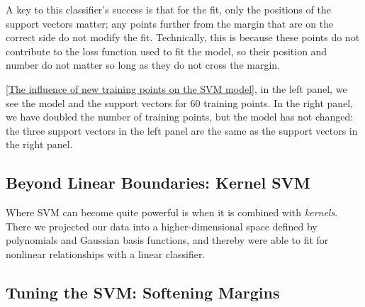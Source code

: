 A key to this classifier’s success is that for the fit, only the positions of the support vectors matter; any points further from the margin that are on the correct side do not modify the fit. Technically, this is because these points do not contribute to the loss function used to fit the model, so their position and number do not matter so long as they do not cross the margin.


\autoref{The influence of new training points on the SVM model}, in the left panel, we see the model and the support vectors for 60 training points. In
the right panel, we have doubled the number of training points, but the model has
not changed: the three support vectors in the left panel are the same as the support
vectors in the right panel. 
\subsection*{Beyond Linear Boundaries: Kernel SVM}
Where SVM can become quite powerful is when it is combined with \textit{kernels}. There we projected our data into a higher-dimensional space defined by polynomials
and Gaussian basis functions, and thereby were able to fit for nonlinear relationships
with a linear classifier.
\subsection*{Tuning the SVM: Softening Margins}


